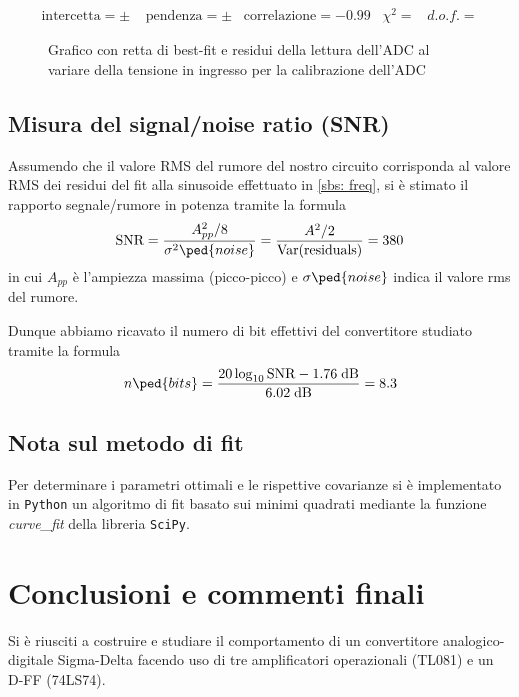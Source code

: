 \documentclass[10pt, a4paper, italian]{article}
\begin{document}
\begin{align*}
\mathrm{intercetta} =  \pm \;  \;\;\;\mathrm{pendenza} = \pm  \;\;\;\mathrm{correlazione} 
= -0.99 \;\;\; \chi^2 =  \;\;\; d.o.f. = 
\end{align*}

\begin{figure}[htbp]
    \centering
    \caption{Grafico con retta di best-fit e residui della lettura dell'ADC
    al variare della tensione in ingresso per la calibrazione dell'ADC
    \label{fig: cal}}
\end{figure}

\subsection{Misura del signal/noise ratio (SNR)}
Assumendo che il valore RMS del rumore del nostro circuito corrisponda al
valore RMS dei residui del fit alla sinusoide effettuato in \cref{sbs: freq},
si è stimato il rapporto segnale/rumore in potenza tramite la formula
\begin{equation}\label{eq: SNR}
\text{SNR} = \frac{A_{pp}^2/8}{\sigma^2\ped{noise}} =
\frac{A^2/2}{\text{Var}(\text{residuals})} = 380
\end{equation}
in cui $A_{pp}$ è l'ampiezza massima (picco-picco) e $\sigma\ped{noise}$ indica
il valore rms del rumore.

Dunque abbiamo ricavato il numero di bit effettivi del convertitore studiato
tramite la formula
\begin{equation}\label{eq: effbit}
n\ped{bits} = \frac{20\log_{10}{\text{SNR}} - 1.76 \; \si{dB}}
{6.02 \; \si{dB}} = 8.3
\end{equation}

\subsection*{Nota sul metodo di fit}
Per determinare i parametri ottimali e le rispettive covarianze si \`e
implementato in \verb+Python+ un algoritmo di fit basato sui minimi quadrati
mediante la funzione \emph{curve\_fit} della libreria \texttt{SciPy}.

\section*{Conclusioni e commenti finali}
Si è riusciti a costruire e studiare il comportamento di un convertitore
analogico-digitale Sigma-Delta facendo uso di tre amplificatori
operazionali (TL081) e un D-FF (74LS74).
\end{document}
